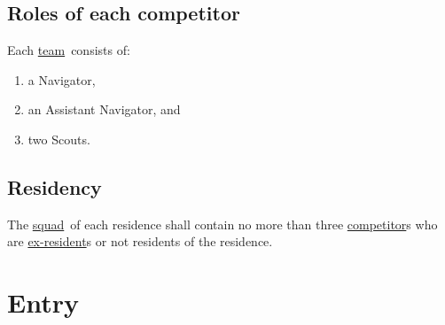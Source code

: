 \documentclass[12pt]{report}
\makeatletter
\newcommand{\nop}[1]{\Hy@raisedlink{\hypertarget{#1}{}}}
\newcommand{\hyplink}[1]{\hyperlink{#1}{{#1}}}
\newcommand{\defi}[1]{\nop{#1}{\textbf{\emph{#1}}}\index{#1}}
\newcommand{\competitor}{\hyplink{competitor}}
\newcommand\Endpoint{end point}
\newcommand\exresident{\hyplink{ex-resident}}
\newcommand{\squad}{\hyplink{squad}}
\newcommand{\team}{\hyplink{team}}
\makeatother
\begin{document}
  \section{Roles of each competitor}
  \begin{fenumerate}
  \item Each \team\ consists of:
  \begin{enumerate}
    \item a Navigator,
    \item an Assistant Navigator, and
    \item two Scouts.
  \end{enumerate}
  \end{fenumerate}
  \section{Residency}
  \begin{fenumerate} \item
  The \squad\ of each residence shall contain no more than three \competitor s who are \exresident s or not residents of the residence.
  \end{fenumerate}

  \chapter{Entry}
\end{document}

